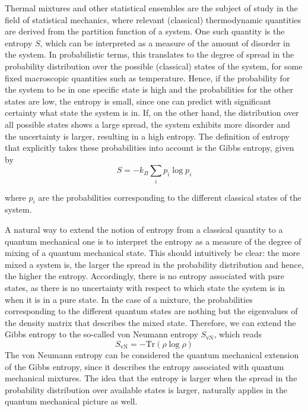 \documentclass[12pt,oneside,openright]{report}
\theoremstyle{definition}
\theoremstyle{plain}
\theoremstyle{remark}
\begin{document}
Thermal mixtures and other statistical ensembles are the subject of study in the field of
statistical mechanics, where relevant (classical) thermodynamic quantities are derived from the
partition function of a system. One such quantity is the entropy $S$, which can be interpreted
as a measure of the amount of disorder in the system. In probabilistic terms,
this translates to the degree of spread in the probability distribution over the possible (classical)
states of the system, for some fixed macroscopic quantities such as temperature. Hence, if the
probability for the system to be in one specific state is high and the probabilities for the other
states are low, the entropy is small, since one can predict with significant certainty what state the
system is in. If, on the other hand, the distribution over all possible states shows a large spread,
the system exhibits more disorder and the uncertainty is larger, resulting in a high entropy. The
definition of entropy that explicitly takes these probabilities into account is the Gibbs
entropy, given by
\begin{equation}
S = - k_B \sum_{i} p_i \log p_i
\end{equation}

where $p_i$ are the probabilities corresponding to the different classical states of the system.

A natural way to extend the notion of entropy from a classical quantity to a quantum mechanical
one is to interpret the entropy as a measure of the degree of mixing of a quantum mechanical
state. This should intuitively be clear: the more mixed a system is, the larger the spread
in the probability distribution and hence, the higher the entropy. Accordingly, there is no
entropy associated with pure states, as there is no uncertainty with respect to which state the system
is in when it is in a pure state. In the case of a mixture, the probabilities corresponding to the
different quantum states are nothing but the eigenvalues of the density matrix that describes the
mixed state. Therefore, we can extend the Gibbs entropy to the so-called von
Neumann entropy $S_\mathrm{vN}$, which reads
\begin{equation}
S_\mathrm{vN} = -\mathrm{Tr}(\rho \log \rho)
\end{equation}
The von Neumann entropy can be considered the quantum mechanical extension of the Gibbs
entropy, since it describes the entropy associated with quantum mechanical mixtures.
The idea that the entropy is larger when the spread in the probability distribution over available 
states is larger, naturally applies in the quantum mechanical picture as well.
\end{document}
